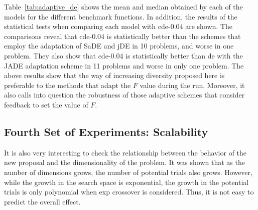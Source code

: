 \documentclass[review,3p]{elsarticle}
\newcommand{\CDE}{c{\sc de}}
\newcommand{\DE}{{\sc de}}
\begin{document}


Table~\ref{tab:adaptive_de} shows the mean and median obtained by each of the models for the different benchmark functions.
%
In addition, the results of the statistical tests when comparing each model with \CDE{}-0.04 are shown.
%
The comparisons reveal that \CDE{}-0.04 is statistically better than the schemes that employ the adaptation of SaDE and jDE in 10 problems,
and worse in one problem.
%
They also show that \CDE{}-0.04 is statistically better than \DE{} with the JADE adaptation scheme in 11 problems and worse
in only one problem.
%
The above results show that the way of increasing diversity proposed here is preferable to the methods that adapt the $F$ value during the run.
%
Moreover, it also calls into question the robustness of those adaptive schemes that consider feedback to set the value of $F$.
%
%

\subsection{Fourth Set of Experiments: Scalability}

It is also very interesting to check the relationship between the behavior of the new proposal and the dimensionality of the
problem.
%
It was shown that as the number of dimensions grows, the number of potential trials also grows.
%
However, while the growth in the search space is exponential, the growth in the potential trials is only polynomial
when exp crossover is considered.
%
Thus, it is not easy to predict the overall effect.
\end{document}
